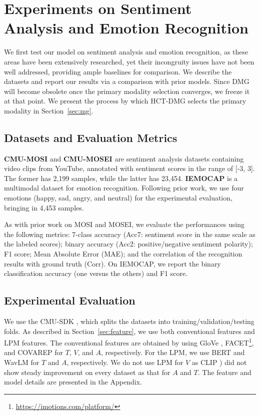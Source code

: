 \documentclass[11pt,a4paper]{article}
\begin{document}
\section{Experiments on Sentiment Analysis and Emotion Recognition}
\label{sec:saer}
We first test our model on sentiment analysis and emotion recognition, as these areas have been extensively researched, yet their incongruity issues have not been well addressed, providing ample baselines for comparison. We describe the datasets and report our results via a comparison with prior models. Since DMG will become obsolete once the primary modality selection converges, we freeze it at that point. We present the process by which HCT-DMG selects the primary modality in Section~\ref{sec:mg}.

\subsection{Datasets and Evaluation Metrics}
\textbf{CMU-MOSI} \citep{Zadeh2016} and \textbf{CMU-MOSEI} \citep{Zadeh2018} are sentiment analysis datasets containing video clips from YouTube, annotated with sentiment scores in the range of [-3, 3]. The former has 2,199 samples, while the latter has 23,454. \textbf{IEMOCAP} \citep{Busso2008} is a multimodal dataset for emotion recognition. Following prior work, we use four emotions (happy, sad, angry, and neutral) for the experimental evaluation, bringing in 4,453 samples.

As with prior work on MOSI and MOSEI, we evaluate the performances using the following metrics: 7-class accuracy (Acc7: sentiment score in the same scale as the labeled scores); binary accuracy (Acc2: positive/negative sentiment polarity); F1 score; Mean Absolute Error (MAE); and the correlation of the recognition results with ground truth (Corr). On IEMOCAP, we report the binary classification accuracy (one versus the others) and F1 score.

\subsection{Experimental Evaluation}
\label{sec:eva}
We use the CMU-SDK \citep{zadeh2018multi}, which splits the datasets into training/validation/testing folds. As described in Section~\ref{sec:feature}, we use both conventional features and LPM features. The conventional features are obtained by using GloVe \citep{pennington2014glove}, FACET\footnote{\url{https://imotions.com/platform/}}, and COVAREP \citep{p56} for $T$, $V$, and $A$, respectively. For the LPM, we use BERT \citep{devlin2018bert} and WavLM \citep{chen2022wavlm} for $T$ and $A$, respectively. We do not use LPM for $V$ as CLIP \citep{radford2021learning}) did not show steady improvement on every dataset as that for $A$ and $T$. The feature and model details are presented in the Appendix.
\end{document}

